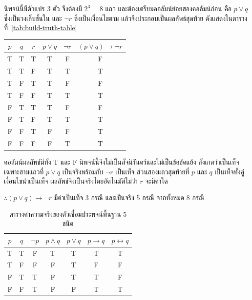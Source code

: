 \begin{solution}
นิพจน์นี้มีตัวแปร 3 ตัว จึงต้องมี $2^3 = 8$ แถว และต้องเตรียมคอลัมน์ย่อยสองคอลัมน์ก่อน คือ $p \lor q$ ซึ่งเป็นวงเล็บชั้นใน และ $\neg r$ ซึ่งเป็นเงื่อนไขตาม แล้วจึงประกอบเป็นผลลัพธ์สุดท้าย ดังแสดงในตารางที่~\ref{tab:build-truth-table}

\begin{center}
\label{tab:build-truth-table}
\begin{tabular}{|c|c|c|c|c|c|}
\hline
$p$ & $q$ & $r$ & $p \lor q$ & $\neg r$ & $(p \lor q) \rightarrow \neg r$ \\ \hline
T & T & T & T & F & F \\ \hline
T & T & F & T & T & T \\ \hline
T & F & T & T & F & F \\ \hline
T & F & F & T & T & T \\ \hline
F & T & T & T & F & F \\ \hline
F & T & F & T & T & T \\ \hline
F & F & T & F & F & T \\ \hline
F & F & F & F & T & T \\ \hline
\end{tabular}
\end{center}

คอลัมน์ผลลัพธ์มีทั้ง $\text{T}$ และ $\text{F}$ นิพจน์นี้จึงไม่เป็นสัจนิรันดร์และไม่เป็นข้อขัดแย้ง สังเกตว่าเป็นเท็จเฉพาะสามแถวที่ $p \lor q$ เป็นจริงพร้อมกับ $\neg r$ เป็นเท็จ ส่วนสองแถวสุดท้ายที่ $p$ และ $q$ เป็นเท็จทั้งคู่ เงื่อนไขนำเป็นเท็จ ผลลัพธ์จึงเป็นจริงโดยอัตโนมัติไม่ว่า $r$ จะมีค่าใด

$\therefore (p \lor q) \rightarrow \neg r$ มีค่าเป็นเท็จ 3 กรณี และเป็นจริง 5 กรณี จากทั้งหมด 8 กรณี \solhere
\end{solution}

\begin{table}[H]
    \centering
    \small
    \caption{ตารางค่าความจริงของตัวเชื่อมประพจน์พื้นฐาน 5 ชนิด}
    \label{tab:connectives}
    \begin{tabular}{|c|c|c|c|c|c|c|}
        \hline
        \textbf{$p$} & \textbf{$q$} & \textbf{$\neg p$} & \textbf{$p \land q$} & \textbf{$p \lor q$} & \textbf{$p \rightarrow q$} & \textbf{$p \leftrightarrow q$} \\ \hline
        T & T & F & T & T & T & T \\ \hline
        T & F & F & F & T & F & F \\ \hline
        F & T & T & F & T & T & F \\ \hline
        F & F & T & F & F & T & T \\ \hline
    \end{tabular}
\end{table}

